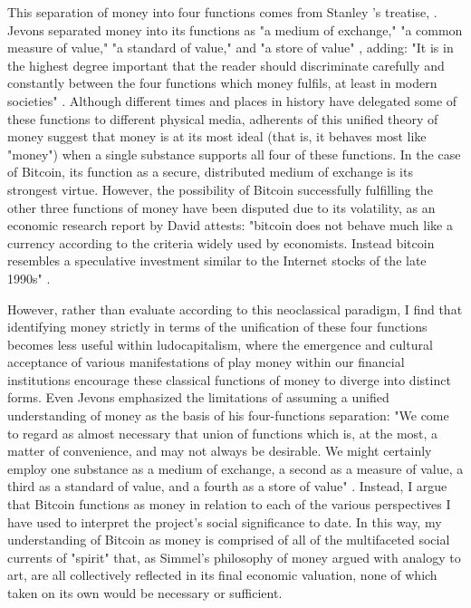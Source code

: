 This separation of money into four functions comes from Stanley \citeauthor{Jevons1875}'s  treatise, . Jevons separated money into its functions as "a medium of exchange," "a common measure of value," "a standard of value," and "a store of value" \autocite[13--5]{Jevons1875}, adding: "It is in the highest degree important that the reader should discriminate carefully and constantly between the four functions which money fulfils, at least in modern societies" \autocite[16]{Jevons1875}. Although different times and places in history have delegated some of these functions to different physical media, adherents of this unified theory of money suggest that money is at its most ideal (that is, it behaves most like "money") when a single substance supports all four of these functions. In the case of Bitcoin, its function as a secure, distributed medium of exchange is its strongest virtue. However, the possibility of Bitcoin successfully fulfilling the other three functions of money have been disputed due to its volatility, as an economic research report by David \citeauthor{Yermack13} attests: "bitcoin does not behave much like a currency according to the criteria widely used by economists. Instead bitcoin resembles a speculative investment similar to the Internet stocks of the late 1990s" \autocite[2]{Yermack13}.

However, rather than evaluate according to this neoclassical paradigm, I find that identifying money strictly in terms of the unification of these four functions becomes less useful within ludocapitalism, where the emergence and cultural acceptance of various manifestations of play money within our financial institutions encourage these classical functions of money to diverge into distinct forms. Even Jevons emphasized the limitations of assuming a unified understanding of money as the basis of his four-functions separation: "We come to regard as almost necessary that union of functions which is, at the most, a matter of convenience, and may not always be desirable. We might certainly employ one substance as a medium of exchange, a second as a measure of value, a third as a standard of value, and a fourth as a store of value" \autocite*[16]{Jevons1875}. Instead, I argue that Bitcoin functions as money in relation to each of the various perspectives I have used to interpret the project's social significance to date. In this way, my understanding of Bitcoin as money is comprised of all of the multifaceted social currents of "spirit" that, as Simmel's philosophy of money argued with analogy to art, are all collectively reflected in its final economic valuation, none of which taken on its own would be necessary or sufficient.

